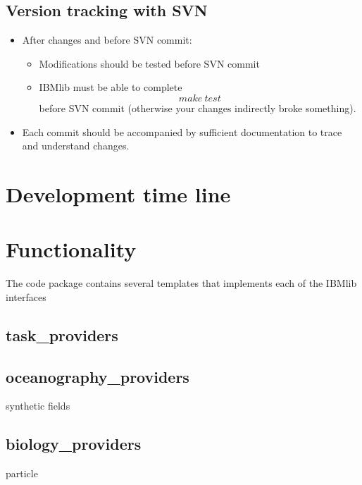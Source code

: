 \section{Version tracking with SVN}
\begin{itemize}
  \item After changes and before SVN commit:
        \begin{itemize}
           \item Modifications should be tested before SVN commit
           \item IBMlib must be able to complete
                 \[ make \ test
                 \]  
                 before SVN commit (otherwise your changes indirectly broke something).
        \end{itemize}
  \item Each commit should be accompanied by sufficient 
        documentation to trace and understand changes.
   
\end{itemize}



\chapter{Development time line}


\chapter{Functionality}

The code package contains several templates that 
implements each of the IBMlib interfaces
\section{task\_providers}
\section{oceanography\_providers}
synthetic fields
\section{biology\_providers}
particle


